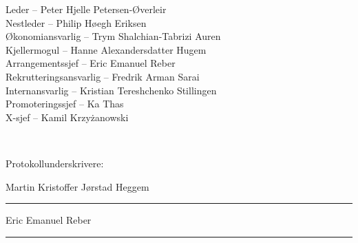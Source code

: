 \documentclass[10pt,norsk,a4paper,usenames,dvipsnames]{article}
\begin{document}
\begin{center}
    \LARGE Leder -- Peter Hjelle Petersen-Øverleir
    \\ Nestleder -- Philip Høegh Eriksen
    \\ Økonomiansvarlig -- Trym Shalchian-Tabrizi Auren
    \\ Kjellermogul -- Hanne Alexandersdatter Hugem
    \\ Arrangementssjef -- Eric Emanuel Reber
    \\ Rekrutteringsansvarlig -- Fredrik Arman Sarai
    \\ Internansvarlig -- Kristian Tereshchenko Stillingen
    \\ Promoteringssjef -- Ka Thas
    \\ X-sjef -- Kamil K\MakeLowercase{RZYŻANOWSKI}
\end{center}

\mbox{}
\\[24pt]

\begin{center}
\LARGE Protokollunderskrivere:\\[30pt]

\begin{multicols}{2}
    \Large
    Martin Kristoffer Jørstad Heggem\\[48pt]
    \rule{220pt}{1pt}

    Eric Emanuel Reber\\[48pt]
    \rule{220pt}{1pt}


\end{multicols}
\end{center}


% 
\end{document}
